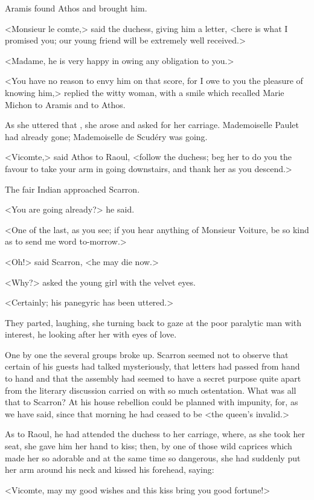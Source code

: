 Aramis found Athos and brought him.

<Monsieur le comte,> said the duchess, giving him a letter, <here is what I promised you; our young friend will be extremely well received.>

<Madame, he is very happy in owing any obligation to you.>

<You have no reason to envy him on that score, for I owe to you the pleasure of knowing him,> replied the witty woman, with a smile which recalled Marie Michon to Aramis and to Athos.

As she uttered that , she arose and asked for her carriage. Mademoiselle Paulet had already gone; Mademoiselle de Scudéry was going.

<Vicomte,> said Athos to Raoul, <follow the duchess; beg her to do you the favour to take your arm in going downstairs, and thank her as you descend.>

The fair Indian approached Scarron.

<You are going already?> he said.

<One of the last, as you see; if you hear anything of Monsieur Voiture, be so kind as to send me word to-morrow.>

<Oh!> said Scarron, <he may die now.>

<Why?> asked the young girl with the velvet eyes.

<Certainly; his panegyric has been uttered.>

They parted, laughing, she turning back to gaze at the poor paralytic man with interest, he looking after her with eyes of love.

One by one the several groups broke up. Scarron seemed not to observe that certain of his guests had talked mysteriously, that letters had passed from hand to hand and that the assembly had seemed to have a secret purpose quite apart from the literary discussion carried on with so much ostentation. What was all that to Scarron? At his house rebellion could be planned with impunity, for, as we have said, since that morning he had ceased to be <the queen's invalid.>

As to Raoul, he had attended the duchess to her carriage, where, as she took her seat, she gave him her hand to kiss; then, by one of those wild caprices which made her so adorable and at the same time so dangerous, she had suddenly put her arm around his neck and kissed his forehead, saying:

<Vicomte, may my good wishes and this kiss bring you good fortune!>

